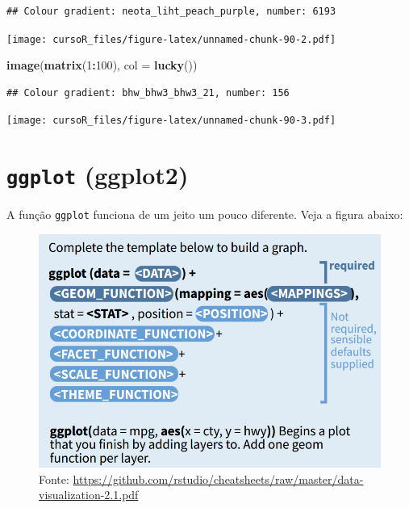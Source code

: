 \documentclass[]{book}
\newenvironment{Shaded}{\begin{snugshade}}{\end{snugshade}}
\newcommand{\KeywordTok}[1]{\textcolor[rgb]{0.13,0.29,0.53}{\textbf{#1}}}
\newcommand{\DataTypeTok}[1]{\textcolor[rgb]{0.13,0.29,0.53}{#1}}
\newcommand{\DecValTok}[1]{\textcolor[rgb]{0.00,0.00,0.81}{#1}}
\newcommand{\OperatorTok}[1]{\textcolor[rgb]{0.81,0.36,0.00}{\textbf{#1}}}
\newcommand{\NormalTok}[1]{#1}
\theoremstyle{definition}
\theoremstyle{definition}
\theoremstyle{definition}
\theoremstyle{remark}
\begin{document}
\begin{verbatim}
## Colour gradient: neota_liht_peach_purple, number: 6193
\end{verbatim}

\texttt{[image: cursoR\_files/figure-latex/unnamed-chunk-90-2.pdf]}

\begin{Shaded}
\begin{Highlighting}[]
\KeywordTok{image}\NormalTok{(}\KeywordTok{matrix}\NormalTok{(}\DecValTok{1}\OperatorTok{:}\DecValTok{100}\NormalTok{), }\DataTypeTok{col =} \KeywordTok{lucky}\NormalTok{())}
\end{Highlighting}
\end{Shaded}

\begin{verbatim}
## Colour gradient: bhw_bhw3_bhw3_21, number: 156
\end{verbatim}

\texttt{[image: cursoR\_files/figure-latex/unnamed-chunk-90-3.pdf]}

\section{\texorpdfstring{\texttt{ggplot}
(ggplot2)}{ggplot (ggplot2)}}\label{ggplot-ggplot2}

A função \texttt{ggplot} funciona de um jeito um pouco diferente. Veja a
figura abaixo:

\begin{figure}
\centering
\includegraphics{figuras/ggplot_guide.png}
\caption{Fonte:
\url{https://github.com/rstudio/cheatsheets/raw/master/data-visualization-2.1.pdf}}
\end{figure}
\end{document}
